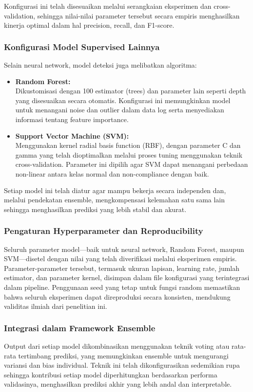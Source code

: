 Konfigurasi ini telah disesuaikan melalui serangkaian eksperimen dan cross-validation, sehingga nilai-nilai parameter tersebut secara empiris menghasilkan kinerja optimal dalam hal precision, recall, dan F1-score.

\subsubsection{Konfigurasi Model Supervised Lainnya}
Selain neural network, model deteksi juga melibatkan algoritma:
\begin{itemize}
    \item \textbf{Random Forest:}\\
    Dikustomisasi dengan 100 estimator (trees) dan parameter lain seperti depth yang disesuaikan secara otomatis. Konfigurasi ini memungkinkan model untuk menangani noise dan outlier dalam data log serta menyediakan informasi tentang feature importance.
    
    \item \textbf{Support Vector Machine (SVM):}\\
    Menggunakan kernel radial basis function (RBF), dengan parameter C dan gamma yang telah dioptimalkan melalui proses tuning menggunakan teknik cross-validation. Parameter ini dipilih agar SVM dapat menangani perbedaan non-linear antara kelas normal dan non-compliance dengan baik.
\end{itemize}

Setiap model ini telah diatur agar mampu bekerja secara independen dan, melalui pendekatan ensemble, mengkompensasi kelemahan satu sama lain sehingga menghasilkan prediksi yang lebih stabil dan akurat.

\subsubsection{Pengaturan Hyperparameter dan Reproducibility}
Seluruh parameter model—baik untuk neural network, Random Forest, maupun SVM—disetel dengan nilai yang telah diverifikasi melalui eksperimen empiris. Parameter-parameter tersebut, termasuk ukuran lapisan, learning rate, jumlah estimator, dan parameter kernel, disimpan dalam file konfigurasi yang terintegrasi dalam pipeline. Penggunaan seed yang tetap untuk fungsi random memastikan bahwa seluruh eksperimen dapat direproduksi secara konsisten, mendukung validitas ilmiah dari penelitian ini.

\subsubsection{Integrasi dalam Framework Ensemble}
Output dari setiap model dikombinasikan menggunakan teknik voting atau rata-rata tertimbang prediksi, yang memungkinkan ensemble untuk mengurangi variansi dan bias individual. Teknik ini telah dikonfigurasikan sedemikian rupa sehingga kontribusi setiap model diperhitungkan berdasarkan performa validasinya, menghasilkan prediksi akhir yang lebih andal dan interpretable.

